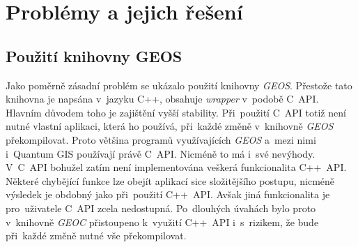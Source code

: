 \chapter{Problémy a jejich řešení}
\label{6-problemy}

\section{Použití knihovny GEOS}

Jako poměrně zásadní problém se ukázalo použití knihovny \textit{GEOS}. Přestože tato knihovna je napsána v~jazyku C++, obsahuje \textit{wrapper} v~podobě C~API. Hlavním
důvodem toho je zajištění vyšší stability. Při~použití C~API totiž není nutné vlastní aplikaci, která ho používá, při~každé změně v~knihovně \textit{GEOS} překompilovat.
Proto většina programů využívajících \textit{GEOS} a~mezi nimi i~Quantum GIS používají právě C~API. Nicméně to má i~své nevýhody. V~C~API bohužel zatím není implementována
veškerá funkcionalita C++~API. Některé chybějící funkce lze obejít aplikací sice složitějšího postupu, nicméně výsledek je obdobný jako při~použití C++~API. Avšak jiná
funkcionalita je pro~uživatele C~API zcela nedostupná. Po~dlouhých úvahách bylo proto v~knihovně \textit{GEOC} přistoupeno k~využití C++~API i~s~rizikem, že bude při~každé
změně nutné vše překompilovat.  